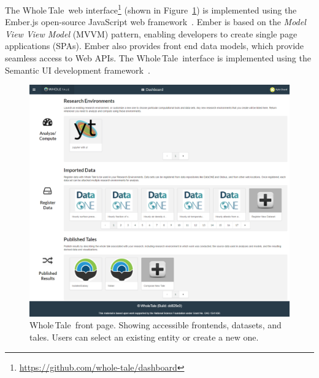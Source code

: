 \documentclass[review]{elsarticle}
\newcommand{\wt}{Whole\,Tale}
\begin{document}
The \wt\ web interface\footnote{\url{https://github.com/whole-tale/dashboard}} 
(shown in Figure~\ref{fig:web}) is implemented using the 
Ember.js open-source JavaScript web framework~\cite{emberjs}. Ember is based on the \emph{Model View View Model} (MVVM) pattern, enabling developers to create single page applications (SPAs). 
Ember also provides front end data models, which provide seamless access to Web APIs. The \wt\ interface is implemented using the Semantic UI development framework~\cite{semantic-ui}. 



\begin{figure}[ht!]
\centering
  \includegraphics[trim=0in 0in 0in 0in,clip,width=0.75\columnwidth]{wt-webinterface.png}
\caption{\wt\ front page. Showing accessible frontends, datasets, and tales. Users can select an existing entity or create a new one. \label{fig:web}}
\end{figure}
\end{document}
